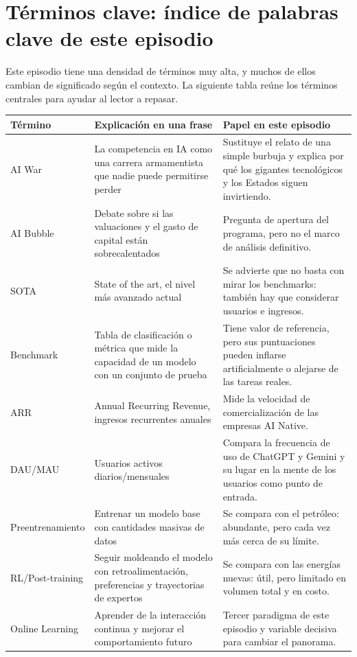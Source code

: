 \section{Términos clave: índice de palabras clave de este episodio}

Este episodio tiene una densidad de términos muy alta, y muchos de ellos cambian de significado según el contexto. La siguiente tabla reúne los términos centrales para ayudar al lector a repasar.

\begin{longtable}{p{}p{}p{}}
\toprule
Término & Explicación en una frase & Papel en este episodio \\
\midrule
AI War & La competencia en IA como una carrera armamentista que nadie puede permitirse perder & Sustituye el relato de una simple burbuja y explica por qué los gigantes tecnológicos y los Estados siguen invirtiendo. \\
AI Bubble & Debate sobre si las valuaciones y el gasto de capital están sobrecalentados & Pregunta de apertura del programa, pero no el marco de análisis definitivo. \\
SOTA & State of the art, el nivel más avanzado actual & Se advierte que no basta con mirar los benchmarks: también hay que considerar usuarios e ingresos. \\
Benchmark & Tabla de clasificación o métrica que mide la capacidad de un modelo con un conjunto de prueba & Tiene valor de referencia, pero sus puntuaciones pueden inflarse artificialmente o alejarse de las tareas reales. \\
ARR & Annual Recurring Revenue, ingresos recurrentes anuales & Mide la velocidad de comercialización de las empresas AI Native. \\
DAU/MAU & Usuarios activos diarios/mensuales & Compara la frecuencia de uso de ChatGPT y Gemini y su lugar en la mente de los usuarios como punto de entrada. \\
Preentrenamiento & Entrenar un modelo base con cantidades masivas de datos & Se compara con el petróleo: abundante, pero cada vez más cerca de su límite. \\
RL/Post-training & Seguir moldeando el modelo con retroalimentación, preferencias y trayectorias de expertos & Se compara con las energías nuevas: útil, pero limitado en volumen total y en costo. \\
Online Learning & Aprender de la interacción continua y mejorar el comportamiento futuro & Tercer paradigma de este episodio y variable decisiva para cambiar el panorama. \\

\end{longtable}
